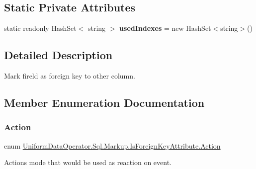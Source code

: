 \subsection*{Static Private Attributes}
\begin{DoxyCompactItemize}
\item 
\mbox{\label{class_uniform_data_operator_1_1_sql_1_1_markup_1_1_is_foreign_key_attribute_a721bfcadb70f6fb4b2c76b980cfcbbd8}} 
static readonly Hash\+Set$<$ string $>$ {\bfseries used\+Indexes} = new Hash\+Set$<$string$>$()
\end{DoxyCompactItemize}


\subsection{Detailed Description}
Mark fireld as foreign key to other column. 



\subsection{Member Enumeration Documentation}
\mbox{\label{class_uniform_data_operator_1_1_sql_1_1_markup_1_1_is_foreign_key_attribute_ae6c77deaf80d5c4d07709edf51eaebc5}} 
\subsubsection{\texorpdfstring{Action}{Action}}
{\footnotesize\ttfamily enum \mbox{\hyperlink{class_uniform_data_operator_1_1_sql_1_1_markup_1_1_is_foreign_key_attribute_ae6c77deaf80d5c4d07709edf51eaebc5}{Uniform\+Data\+Operator.\+Sql.\+Markup.\+Is\+Foreign\+Key\+Attribute.\+Action}}\hspace{0.3cm}{\ttfamily [strong]}}



Action\textquotesingle{}s mode that would be used as reaction on event. 

